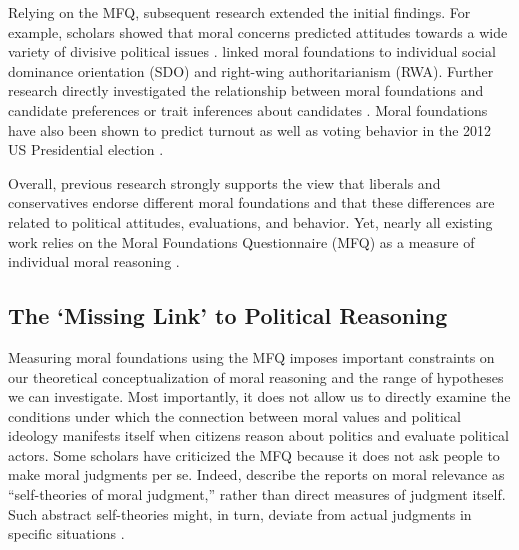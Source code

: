 \documentclass[12pt]{article}
\begin{document}
Relying on the MFQ, subsequent research extended the initial findings. For example, scholars showed that moral concerns predicted attitudes towards a wide variety of divisive political issues \citep[e.g.][]{koleva2012tracing,low2015moral}. \citet{federico2013mapping} linked moral foundations to individual social dominance orientation (SDO) and right-wing authoritarianism (RWA). Further research directly investigated the relationship between moral foundations and candidate preferences \citep{iyer2010beyond} or trait inferences about candidates \citep{clifford2014linking}. Moral foundations have also been shown to predict turnout \citep{johnson2014ideology} as well as voting behavior in the 2012 US Presidential election \citep{franks2015using}.

Overall, previous research strongly supports the view that liberals and conservatives endorse different moral foundations and that these differences are related to political attitudes, evaluations, and behavior. Yet, nearly all existing work relies on the Moral Foundations Questionnaire (MFQ) as a measure of individual moral reasoning \citep[but see][]{clifford2014linking}. 


\subsection{The `Missing Link' to Political Reasoning}

Measuring moral foundations using the MFQ imposes important constraints on our theoretical conceptualization of moral reasoning and the range of hypotheses we can investigate. Most importantly, it does not allow us to directly examine the conditions under which the connection between moral values and political ideology manifests itself when citizens reason about politics and evaluate political actors. Some scholars have criticized the MFQ because it does not ask people to make moral judgments per se. Indeed, \citet[1031]{graham2009liberals} describe the reports on moral relevance as ``self-theories of moral judgment,'' rather than direct measures of judgment itself. Such abstract self-theories might, in turn, deviate from actual judgments in specific situations \citep[see][for an alternative way to measure moral judgment]{clifford2015moral}.
\end{document}
